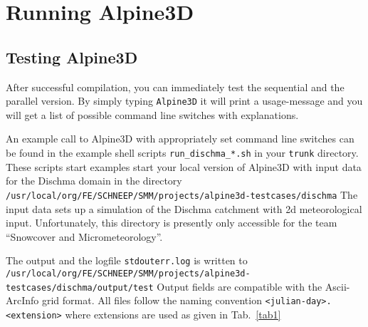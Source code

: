 \documentclass[12pt]{report}
\begin{document}
\chapter{Running Alpine3D}\label{ch:running}



\section{Testing Alpine3D}

After successful compilation, you can immediately test the sequential
and the parallel version. By simply typing \verb+Alpine3D+ it will
print a usage-message and you will get a list of possible command line
switches with explanations.

An example call to Alpine3D with appropriately set command line
switches can be found in the example shell scripts
\verb+run_dischma_*.sh+ in your \verb+trunk+ directory. These scripts start
examples start your local version of Alpine3D with input data for the
Dischma domain in the
directory\\
{\small \verb+/usr/local/org/FE/SCHNEEP/SMM/projects/alpine3d-testcases/dischma+}
The input data sets up a simulation of the Dischma catchment with 2d
meteorological input. Unfortunately, this directory is presently only accessible for the
team ``Snowcover and Micrometeorology''.

The output and the logfile \verb+stdouterr.log+ is written to\\
{\small
  \verb+/usr/local/org/FE/SCHNEEP/SMM/projects/alpine3d-testcases/dischma/output/test+
}
Output fields are compatible with the Ascii-ArcInfo grid format. All files
follow the naming convention \verb+<julian-day>.<extension>+ where
extensions are used as given in Tab.~\ref{tab1}
\end{document}
